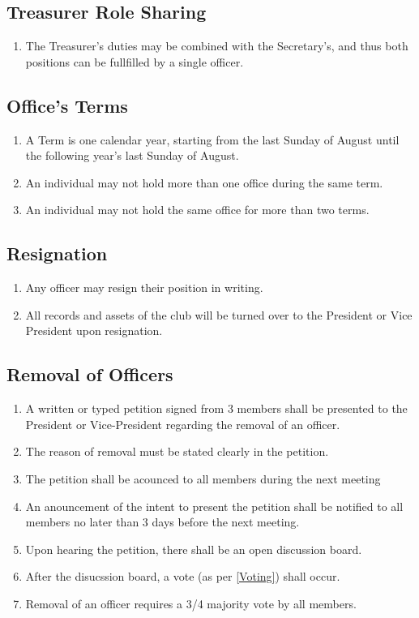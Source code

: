 \documentclass[a4paper,12pt]{article}
\begin{document}
\subsection{Treasurer Role Sharing}
\begin{enumerate}
  \item The Treasurer's duties may be combined with the Secretary's, and thus both positions can be fullfilled by a single officer.
\end{enumerate}

\subsection{Office's Terms}
\begin{enumerate}
  \item A Term is one calendar year, starting from the last Sunday of August until the following year's last Sunday of August.
  \item An individual may not hold more than one office during the same term.
  \item An individual may not hold the same office for more than two terms.
\end{enumerate}

\subsection{Resignation}
\begin{enumerate}
  \item Any officer may resign their position in writing.
  \item All records and assets of the club will be turned over to the President or Vice President upon resignation.
\end{enumerate}

\subsection{Removal of Officers} \label{officer-removal}
\begin{enumerate}
  \item A written or typed petition signed from 3 members shall be presented to the President or Vice-President regarding the removal of an officer.
  \item The reason of removal must be stated clearly in the petition.
  \item The petition shall be acounced to all members during the next meeting
  \item An anouncement of the intent to present the petition shall be notified to all members no later than 3 days before the next meeting.
  \item Upon hearing the petition, there shall be an open discussion board.
  \item After the disucssion board, a vote (as per \cref{Voting}) shall occur. 
  \item Removal of an officer requires a 3/4 majority vote by all members.
\end{enumerate}
\end{document}
